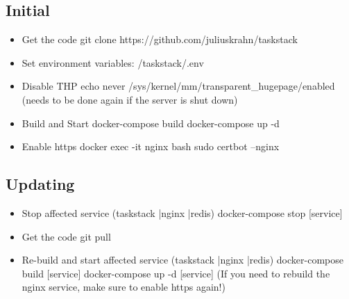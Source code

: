 \documentclass[a4paper, 12pt]{article}
\begin{document}
\subsection{Initial}

\begin{itemize}
    \item Get the code \newline git clone https://github.com/juliuskrahn/taskstack
    \item Set environment variables: /taskstack/.env
    \item Disable THP \newline echo never /sys/kernel/mm/transparent\_hugepage/enabled \newline
    (needs to be done again if the server is shut down)
    \item Build and Start \newline docker-compose build \newline
    docker-compose up -d
    \item Enable https \newline
    docker exec -it nginx bash \newline
    sudo certbot –nginx
\end{itemize}

\subsection{Updating}

\begin{itemize}
    \item Stop affected service (taskstack |nginx |redis) \newline
    docker-compose stop [service]
    \item Get the code \newline
    git pull
    \item Re-build and start affected service (taskstack |nginx |redis) \newline
    docker-compose build [service] \newline
    docker-compose up -d [service] \newline
    (If you need to rebuild the nginx service, make sure to enable https again!)
\end{itemize}

\newpage
\end{document}
